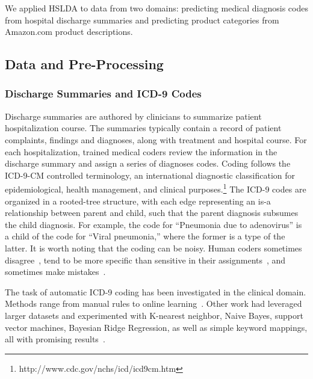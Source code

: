 
We applied HSLDA to data from two domains: predicting medical
diagnosis codes from hospital discharge summaries and predicting product
categories from Amazon.com product descriptions.


\subsection{Data and Pre-Processing}

\subsubsection{Discharge Summaries and ICD-9 Codes}

Discharge summaries are authored by clinicians to summarize patient hospitalization course. 
The summaries typically contain a record of patient
complaints, findings and diagnoses, along with treatment and hospital course.
For each hospitalization, trained medical coders review the information in the
discharge summary and assign a series of diagnoses codes. Coding follows the
ICD-9-CM controlled terminology, an international diagnostic classification for
epidemiological, health management, and clinical
purposes.\footnote{http://www.cdc.gov/nchs/icd/icd9cm.htm}  The ICD-9 codes are organized in a rooted-tree structure, with each
edge representing an is-a relationship between parent and child, such that the
parent diagnosis subsumes the child diagnosis. For example, the code for
{}``Pneumonia due to adenovirus'' is a child of the code for {}``Viral
pneumonia,'' where the former is a type of the latter.  It is worth noting that
the coding can be noisy. Human coders sometimes disagree~\cite{Challenge07},
tend to be more specific than sensitive in their
assignments~\cite{Birmetal2005}, and sometimes make
mistakes~\cite{FarzandipourEtAl10}. 

The task of automatic ICD-9 coding has been investigated in the clinical
domain.  Methods range from manual
rules to online learning~\cite{Crammer2007,Goldstein2007,Farkas2008}.
Other work had leveraged larger datasets and experimented with K-nearest
neighbor, Naive Bayes, support vector machines, Bayesian Ridge Regression, as
well as simple keyword mappings, all with promising
results~\cite{LarkeyCroft95,RibeiroNeto2001,PakhomovEtAl06,Ruch2008,Lita2008}.

